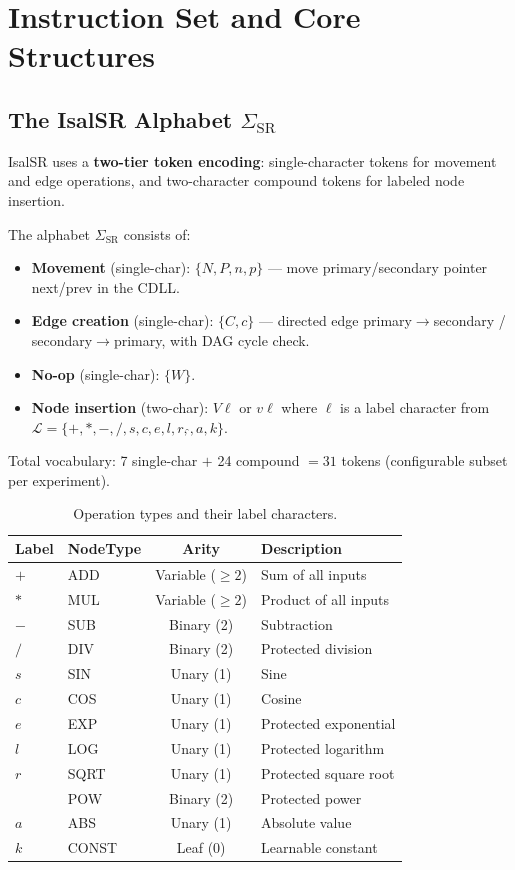 \section{Instruction Set and Core Structures}
\label{sec:instruction_set}

\subsection{The IsalSR Alphabet $\Sigma_{\mathrm{SR}}$}

IsalSR uses a \textbf{two-tier token encoding}: single-character tokens for
movement and edge operations, and two-character compound tokens for labeled
node insertion.

\begin{definition}
The alphabet $\Sigma_{\mathrm{SR}}$ consists of:
\begin{itemize}[nosep]
  \item \textbf{Movement} (single-char): $\{N, P, n, p\}$ --- move primary/secondary
    pointer next/prev in the CDLL.
  \item \textbf{Edge creation} (single-char): $\{C, c\}$ --- directed edge
    primary$\to$secondary / secondary$\to$primary, with DAG cycle check.
  \item \textbf{No-op} (single-char): $\{W\}$.
  \item \textbf{Node insertion} (two-char): $V\ell$ or $v\ell$ where $\ell$ is a
    label character from
    $\mathcal{L} = \{+, *, -, /, s, c, e, l, r, \hat{}, a, k\}$.
\end{itemize}
Total vocabulary: 7 single-char $+$ 24 compound $= 31$ tokens (configurable
subset per experiment).
\end{definition}

\begin{table}[h]
\centering
\caption{Operation types and their label characters.}
\label{tab:operations}
\begin{tabular}{llcl}
\toprule
Label & NodeType & Arity & Description \\
\midrule
$+$ & ADD & Variable ($\geq 2$) & Sum of all inputs \\
$*$ & MUL & Variable ($\geq 2$) & Product of all inputs \\
$-$ & SUB & Binary (2) & Subtraction \\
$/$ & DIV & Binary (2) & Protected division \\
$s$ & SIN & Unary (1) & Sine \\
$c$ & COS & Unary (1) & Cosine \\
$e$ & EXP & Unary (1) & Protected exponential \\
$l$ & LOG & Unary (1) & Protected logarithm \\
$r$ & SQRT & Unary (1) & Protected square root \\
$\hat{}$ & POW & Binary (2) & Protected power \\
$a$ & ABS & Unary (1) & Absolute value \\
$k$ & CONST & Leaf (0) & Learnable constant \\
\bottomrule
\end{tabular}
\end{table}

